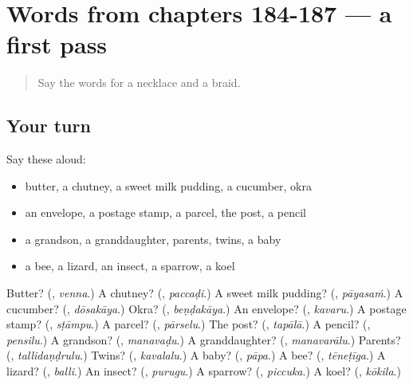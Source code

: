 \section[(dialogue)]{Words from chapters 184-187 — a first pass}

\label{lesson:TE-R192-first-pass-words-from-chapters-184-187}



\begin{quote}
Say the words for a necklace and a braid.
\end{quote}

\subsection*{Your turn}
Say these aloud:

\begin{itemize}
\raggedright
  \item butter, a chutney, a sweet milk pudding, a cucumber, okra
  \item an envelope, a postage stamp, a parcel, the post, a pencil
  \item a grandson, a granddaughter, parents, twins, a baby
  \item a bee, a lizard, an insect, a sparrow, a koel
\end{itemize}

\begin{tcolorbox}[breakable,colback=teal!4,colframe=teal!35!black,title={Before you move on}]
Butter? (\textbf{}, \emph{venna}.) A chutney? (\textbf{}, \emph{paccaḍi}.) A sweet milk pudding? (\textbf{}, \emph{pāyasaṁ}.) A cucumber? (\textbf{}, \emph{dōsakāya}.) Okra? (\textbf{}, \emph{beṇḍakāya}.) An envelope? (\textbf{}, \emph{kavaru}.) A postage stamp? (\textbf{}, \emph{sṭāmpu}.) A parcel? (\textbf{}, \emph{pārselu}.) The post? (\textbf{}, \emph{tapālā}.) A pencil? (\textbf{}, \emph{pensilu}.) A grandson? (\textbf{}, \emph{manavaḍu}.) A granddaughter? (\textbf{}, \emph{manavarālu}.) Parents? (\textbf{}, \emph{tallidaṇḍrulu}.) Twins? (\textbf{}, \emph{kavalalu}.) A baby? (\textbf{}, \emph{pāpa}.) A bee? (\textbf{}, \emph{tēneṭīga}.) A lizard? (\textbf{}, \emph{balli}.) An insect? (\textbf{}, \emph{purugu}.) A sparrow? (\textbf{}, \emph{piccuka}.) A koel? (\textbf{}, \emph{kōkila}.)
\end{tcolorbox}
